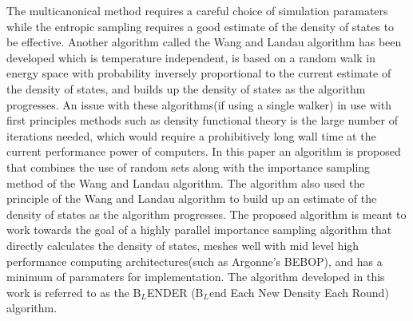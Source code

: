\documentclass[aps,pre,reprint,superscriptaddress,showkeys]{revtex4-1}
\begin{document}
The multicanonical method requires a careful choice of simulation paramaters while the entropic sampling requires a good estimate of the density of states to be effective.  Another algorithm called the  Wang and Landau algorithm \cite{WL_phys_rev_lett,Wang_Landau_phys_rev_E} has been developed which is temperature independent, is based on a random walk in energy space with probability inversely proportional to the current estimate of the  density of states, and builds up the  density of states as the algorithm progresses.  An issue with these algorithms(if using a single walker) in use with first principles methods such as density functional theory is the large number of iterations needed, which would require a prohibitively long wall time at the current performance power of computers.  In this paper an algorithm is proposed that combines the use of random sets along with the importance sampling method of the Wang and Landau algorithm. The algorithm also used the principle of the Wang and Landau algorithm to build up an estimate of the  density of states as the algorithm progresses.  The proposed algorithm is meant to work towards the goal of a highly parallel importance sampling algorithm that directly calculates the  density of states, meshes well with mid level high performance computing architectures(such as Argonne's BEBOP), and has a minimum of paramaters for implementation. The algorithm developed in this work is referred to as the B$_{L}$ENDER (B$_{L}$end Each New Density Each Round) algorithm. 
\end{document}
